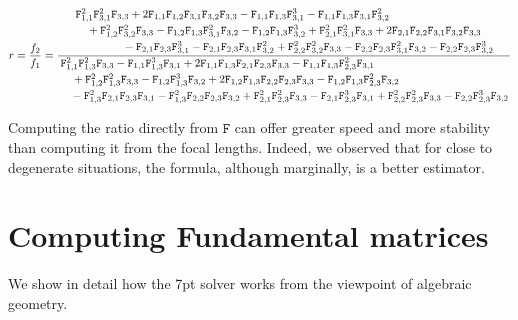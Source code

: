 
{\tiny
\begin{equation}
r = \frac{f_2}{f_1} =  
\dfrac{\splitdfrac{\splitdfrac{\M{F}_{1,1}^2 \M{F}_{3,1}^2 \M{F}_{3,3}+2 \M{F}_{1,1} \M{F}_{1,2} \M{F}_{3,1} \M{F}_{3,2} \M{F}_{3,3}-\M{F}_{1,1} \M{F}_{1,3} \M{F}_{3,1}^3-\M{F}_{1,1} \M{F}_{1,3} \M{F}_{3,1} \M{F}_{3,2}^2}{+\M{F}_{1,2}^2 \M{F}_{3,2}^2 \M{F}_{3,3}-\M{F}_{1,2} \M{F}_{1,3} \M{F}_{3,1}^2 \M{F}_{3,2}-\M{F}_{1,2} \M{F}_{1,3} \M{F}_{3,2}^3+\M{F}_{2,1}^2 \M{F}_{3,1}^2 \M{F}_{3,3}+2 \M{F}_{2,1} \M{F}_{2,2} \M{F}_{3,1} \M{F}_{3,2} \M{F}_{3,3}}}{-\M{F}_{2,1} \M{F}_{2,3} \M{F}_{3,1}^3-\M{F}_{2,1} \M{F}_{2,3} \M{F}_{3,1} \M{F}_{3,2}^2+\M{F}_{2,2}^2 \M{F}_{3,2}^2 \M{F}_{3,3}-\M{F}_{2,2} \M{F}_{2,3} \M{F}_{3,1}^2 \M{F}_{3,2}-\M{F}_{2,2} \M{F}_{2,3} \M{F}_{3,2}^3}}{\splitdfrac{\splitdfrac{\M{F}_{1,1}^2 \M{F}_{1,3}^2 \M{F}_{3,3}-\M{F}_{1,1} \M{F}_{1,3}^3 \M{F}_{3,1}+2 \M{F}_{1,1} \M{F}_{1,3} \M{F}_{2,1} \M{F}_{2,3} \M{F}_{3,3}-\M{F}_{1,1} \M{F}_{1,3} \M{F}_{2,3}^2 \M{F}_{3,1}}{+\M{F}_{1,2}^2 \M{F}_{1,3}^2 \M{F}_{3,3}-\M{F}_{1,2} \M{F}_{1,3}^3 \M{F}_{3,2}+2 \M{F}_{1,2} \M{F}_{1,3} \M{F}_{2,2} \M{F}_{2,3} \M{F}_{3,3}-\M{F}_{1,2} \M{F}_{1,3} \M{F}_{2,3}^2 \M{F}_{3,2}}}{-\M{F}_{1,3}^2 \M{F}_{2,1} \M{F}_{2,3} \M{F}_{3,1}-\M{F}_{1,3}^2 \M{F}_{2,2} \M{F}_{2,3} \M{F}_{3,2}+\M{F}_{2,1}^2 \M{F}_{2,3}^2 \M{F}_{3,3}-\M{F}_{2,1} \M{F}_{2,3}^3 \M{F}_{3,1}+\M{F}_{2,2}^2 \M{F}_{2,3}^2 \M{F}_{3,3}-\M{F}_{2,2} \M{F}_{2,3}^3 \M{F}_{3,2}}}
\end{equation}
}

Computing the ratio directly from $\mathtt{F}$ can offer  greater speed and more stability than computing it from the focal lengths. Indeed, we observed that for close to degenerate situations, the formula,  although marginally, is a better estimator. 

\section{Computing Fundamental matrices}

We show in detail how the 7pt solver works from the viewpoint of algebraic geometry.


